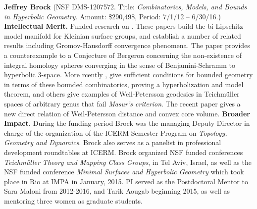 \textbf{Jeffrey Brock} (NSF DMS-1207572. Title: {\em Combinatorics, Models, and
  Bounds in Hyperbolic Geometry}. Amount: \$290,498, Period: 7/1/12 --
6/30/16.)  \textbf{Intellectual Merit.} 
Funded research on 
\cite{Brock:Canary:Minsky:elc,BBCM:pullout,
BBCL:dlt,Brock:Dunfield:inj,Brock:ams}.
 These papers build the bi-Lipschitz model manifold for Kleinian surface groups, and establish a number of related results including Gromov-Hausdorff convergence phenomena.
The paper \cite{Brock:Dunfield:inj} provides a counterexample to a Conjecture of Bergeron concerning the non-existence of integral homology spheres converging in the sense of
Benjamini-Schramm to hyperbolic 3-space.  
More rcently \cite{BMNS:bounded:models,Brock:Modami:nue,Brock:Bromberg:vol,Brock:Bromberg:cone:inflex}, give sufficient conditions for bounded geometry in terms of these bounded combinatorics, proving a hyperbolization and model theorem, and others give examples of Weil-Petersson geodesics in Teichm\"uller spaces of arbitrary genus that fail {\em Masur's criterion}. The recent paper
  \cite{Brock:Bromberg:vol} gives a new direct relation of Weil-Petersson distance and convex core volume.
\textbf{Broader Impact.} During the funding period Brock was the managing Deputy Director in  charge of the organization of the ICERM Semester Program on {\em Topology, Geometry and Dynamics}. Brock also serves as a panelist in professional development roundtables at
  ICERM. Brock organized NSF funded conferences \textit{ Teichm\"uller Theory and Mapping Class Groups}, in Tel Aviv, Israel, as well as the NSF funded conference \textit{ Minimal Surfaces and Hyperbolic Geometry} which took place in Rio at IMPA in January, 2015.
PI served as the Postdoctoral Mentor to Sara Maloni from 2012-2016, and Tarik Aougab beginning 2015, as well as mentoring three women as graduate students. 